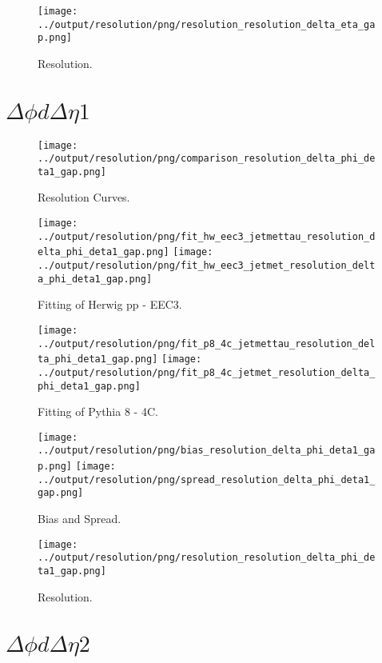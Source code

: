 \documentclass[11pt]{book}
\begin{document}
\begin{figure}[ht]
\centering
\texttt{[image: ../output/resolution/png/resolution\_resolution\_delta\_eta\_gap.png]}
\caption{Resolution.}
\end{figure}
\clearpage



\section{$\Delta\phi d\Delta\eta 1$}

\begin{figure}[ht]
\centering
\texttt{[image: ../output/resolution/png/comparison\_resolution\_delta\_phi\_deta1\_gap.png]}
\caption{Resolution Curves.}
\end{figure}


\begin{figure}[ht]
\centering
\texttt{[image: ../output/resolution/png/fit\_hw\_eec3\_jetmettau\_resolution\_delta\_phi\_deta1\_gap.png]}
\texttt{[image: ../output/resolution/png/fit\_hw\_eec3\_jetmet\_resolution\_delta\_phi\_deta1\_gap.png]}
\caption{Fitting of Herwig pp - EEC3.}
\end{figure}

\begin{figure}[ht]
\centering
\texttt{[image: ../output/resolution/png/fit\_p8\_4c\_jetmettau\_resolution\_delta\_phi\_deta1\_gap.png]}
\texttt{[image: ../output/resolution/png/fit\_p8\_4c\_jetmet\_resolution\_delta\_phi\_deta1\_gap.png]}
\caption{Fitting of Pythia 8 - 4C.}
\end{figure}

\begin{figure}[ht]
\centering
\texttt{[image: ../output/resolution/png/bias\_resolution\_delta\_phi\_deta1\_gap.png]}
\texttt{[image: ../output/resolution/png/spread\_resolution\_delta\_phi\_deta1\_gap.png]}
\caption{Bias and Spread.}
\end{figure}


\begin{figure}[ht]
\centering
\texttt{[image: ../output/resolution/png/resolution\_resolution\_delta\_phi\_deta1\_gap.png]}
\caption{Resolution.}
\end{figure}
\clearpage


\section{$\Delta\phi d\Delta\eta 2$}
\end{document}
